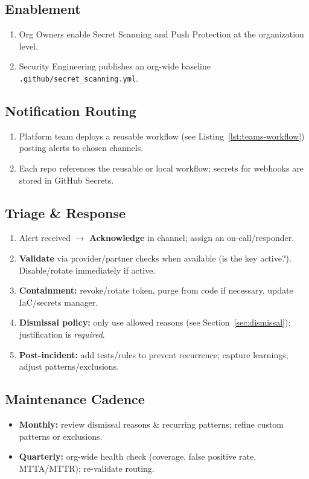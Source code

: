 \documentclass[11pt,a4paper,oneside,notitlepage]{article}
\begin{document}
\subsection{Enablement}
\begin{enumerate}[label=\alph*)]
  \item Org Owners enable Secret Scanning and Push Protection at the organization level.
  \item Security Engineering publishes an org-wide baseline \texttt{.github/secret\_scanning.yml}.
\end{enumerate}

\subsection{Notification Routing}
\begin{enumerate}[label=\alph*)]
  \item Platform team deploys a reusable workflow (see Listing~\ref{lst:teams-workflow}) posting alerts to chosen channels.
  \item Each repo references the reusable or local workflow; secrets for webhooks are stored in GitHub Secrets.
\end{enumerate}

\subsection{Triage \& Response}
\begin{enumerate}[label=\alph*)]
  \item Alert received $\rightarrow$ \textbf{Acknowledge} in channel; assign an on-call/responder.
  \item \textbf{Validate} via provider/partner checks when available (is the key active?). Disable/rotate immediately if active.
  \item \textbf{Containment:} revoke/rotate token, purge from code if necessary, update IaC/secrets manager.
  \item \textbf{Dismissal policy:} only use allowed reasons (see Section~\ref{sec:dismissal}); justification is \emph{required}.
  \item \textbf{Post-incident:} add tests/rules to prevent recurrence; capture learnings; adjust patterns/exclusions.
\end{enumerate}

\subsection{Maintenance Cadence}
\begin{itemize}
  \item \textbf{Monthly:} review dismissal reasons \& recurring patterns; refine custom patterns or exclusions.
  \item \textbf{Quarterly:} org-wide health check (coverage, false positive rate, MTTA/MTTR); re-validate routing.
\end{itemize}
\end{document}
